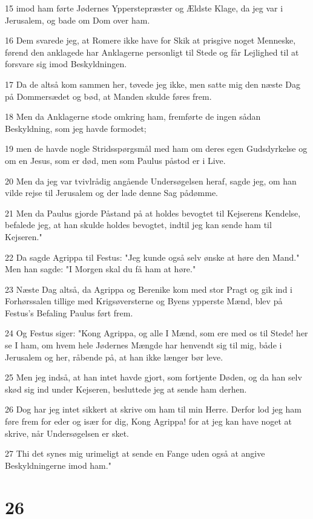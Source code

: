 \par 15 imod ham førte Jødernes Ypperstepræster og Ældste Klage, da jeg var i Jerusalem, og bade om Dom over ham.
\par 16 Dem svarede jeg, at Romere ikke have for Skik at prisgive noget Menneske, førend den anklagede har Anklagerne personligt til Stede og får Lejlighed til at forsvare sig imod Beskyldningen.
\par 17 Da de altså kom sammen her, tøvede jeg ikke, men satte mig den næste Dag på Dommersædet og bød, at Manden skulde føres frem.
\par 18 Men da Anklagerne stode omkring ham, fremførte de ingen sådan Beskyldning, som jeg havde formodet;
\par 19 men de havde nogle Stridsspørgsmål med ham om deres egen Gudsdyrkelse og om en Jesus, som er død, men som Paulus påstod er i Live.
\par 20 Men da jeg var tvivlrådig angående Undersøgelsen heraf, sagde jeg, om han vilde rejse til Jerusalem og der lade denne Sag pådømme.
\par 21 Men da Paulus gjorde Påstand på at holdes bevogtet til Kejserens Kendelse, befalede jeg, at han skulde holdes bevogtet, indtil jeg kan sende ham til Kejseren."
\par 22 Da sagde Agrippa til Festus: "Jeg kunde også selv ønske at høre den Mand." Men han sagde: "I Morgen skal du få ham at høre."
\par 23 Næste Dag altså, da Agrippa og Berenike kom med stor Pragt og gik ind i Forhørssalen tillige med Krigsøversterne og Byens ypperste Mænd, blev på Festus's Befaling Paulus ført frem.
\par 24 Og Festus siger: "Kong Agrippa, og alle I Mænd, som ere med os til Stede! her se I ham, om hvem hele Jødernes Mængde har henvendt sig til mig, både i Jerusalem og her, råbende på, at han ikke længer bør leve.
\par 25 Men jeg indså, at han intet havde gjort, som fortjente Døden, og da han selv skød sig ind under Kejseren, besluttede jeg at sende ham derhen.
\par 26 Dog har jeg intet sikkert at skrive om ham til min Herre. Derfor lod jeg ham føre frem for eder og især for dig, Kong Agrippa! for at jeg kan have noget at skrive, når Undersøgelsen er sket.
\par 27 Thi det synes mig urimeligt at sende en Fange uden også at angive Beskyldningerne imod ham."

\chapter{26}

